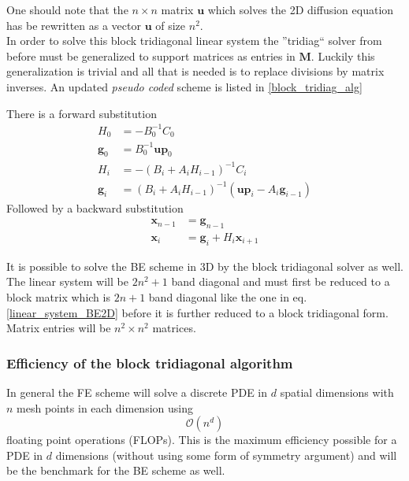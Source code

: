 One should note that the $n\times n$ matrix $\mathbf u$ which solves the 2D diffusion equation has be rewritten as a vector $\mathbf{u}$ of size $n^2$. \\ 

In order to solve this block tridiagonal linear system the ''tridiag`` solver from before must be generalized to support matrices as entries in $\mathbf M$. 
Luckily this generalization is trivial and all that is needed is to replace divisions by matrix inverses. 
An updated \emph{pseudo coded} scheme is listed in \eqref{block_tridiag_alg}

\noindent There is a forward substitution
\begin{align}\label{block_tridiag_alg}
 H_0 &= -B_0^{-1}C_0\nonumber \\
 \mathbf{g}_0 &= B_0^{-1}\mathbf{up}_0 \nonumber\\
 H_i &= -\left(B_i+A_iH_{i-1}\right)^{-1}C_i \nonumber \\
 \mathbf{g}_i &= \left(B_i+A_iH_{i-1}\right)^{-1}\left(\mathbf{up}_i-A_i\mathbf{g}_{i-1}\right)
 \end{align}
 Followed by a backward substitution
 \begin{align*}
  \mathbf{x}_{n-1} &= \mathbf{g}_{n-1}\nonumber\\
  \mathbf{x}_i &= \mathbf{g}_i + H_i\mathbf{x}_{i+1} \nonumber
 \end{align*}
 
 \noindent It is possible to solve the BE scheme in 3D by the block tridiagonal solver as well. 
 The linear system will be $2n^2 +1$ band diagonal and must first be reduced to a block matrix which is $2n+1$ band diagonal like the one in eq. \eqref{linear_system_BE2D} before it is further reduced to a block tridiagonal form. 
 Matrix entries will be $n^2\times n^2$ matrices.
 
 \subsubsection{Efficiency of the block tridiagonal algorithm}
 
 In general the FE scheme will solve a discrete PDE in $d$ spatial dimensions with $n$ mesh points in each dimension using
 \begin{equation*}
  \mathcal O(n^d)
 \end{equation*}
floating point operations (FLOPs). 
This is the maximum efficiency possible for a PDE in $d$ dimensions (without using some form of symmetry argument) and will be the benchmark for the BE scheme as well.\\

